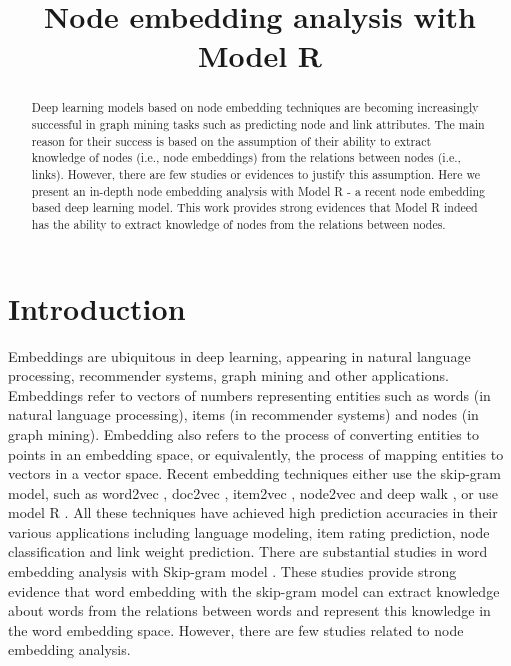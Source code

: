 \documentclass[conference]{IEEEtran}
\begin{document}
\title{Node embedding analysis with Model R}
\author{
	\and
}
\maketitle

\begin{abstract}
Deep learning models based on node embedding techniques are becoming increasingly successful in graph mining tasks such as predicting node and link attributes.
The main reason for their success is based on the assumption of their ability to extract knowledge of nodes (i.e., node embeddings) from the relations between nodes (i.e., links).
However, there are few studies or evidences to justify this assumption.
Here we present an in-depth node embedding analysis with Model R - a recent node embedding based deep learning model.
This work provides strong evidences that Model R indeed has the ability to extract knowledge of nodes from the relations between nodes.
\end{abstract}
	
\section{Introduction}
Embeddings are ubiquitous in deep learning, appearing in natural language processing, recommender systems, graph mining and other applications.
Embeddings refer to vectors of numbers representing entities such as
words (in natural language processing),
items (in recommender systems) and
nodes (in graph mining).
Embedding also refers to
the process of converting entities to points in an embedding space,
or equivalently,
the process of mapping entities to vectors in a vector space.
Recent embedding techniques either use the skip-gram model, such as
word2vec \cite{mikolov2013linguistic},
doc2vec \cite{le2014distributed},
item2vec \cite{barkan2016item2vec},
node2vec \cite{grover2016node2vec} and
deep walk \cite{perozzi2014deepwalk},
or use model R \cite{hou2017deep}.
All these techniques have achieved high prediction accuracies in their various applications including language modeling, item rating prediction, node classification and link weight prediction.
There are substantial studies in word embedding analysis with Skip-gram model \cite{mikolov2013distributed}.
These studies provide strong evidence that word embedding with the skip-gram model can extract knowledge about words from the relations between words and represent this knowledge in the word embedding space.
However, there are few studies related to node embedding analysis.
\end{document}
